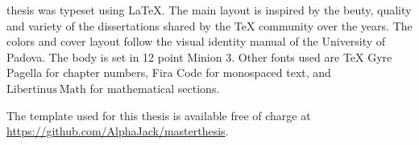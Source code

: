 \cleardoublepage

\thispagestyle{empty}


{%
 
 
 \centering
 \setlength{\parindent}{0mm}
 
 \begin{minipage}{110mm}
  \hfill
  \hfill
  \vspace{10mm}

   thesis was typeset using \LaTeX{}.
  The main layout is inspired by the beuty, quality and variety of the dissertations shared by the \TeX{} community over the years.
  The colors and cover layout follow the visual identity manual of the University of Padova.
  The body is set in 12 point Minion 3.
  Other fonts used are {\TitleNumberFont\TeX{} Gyre Pagella} for chapter numbers, 
  {\small\ttfamily Fira Code} for monospaced text, 
  and \(\mathrm{Libertinus\ Math}\) for mathematical sections.

  The template used for this thesis is available free of charge at \url{https://github.com/AlphaJack/masterthesis}.
 \end{minipage}
 \vspace{10mm}
 
 
 \null

} %


\clearpage

